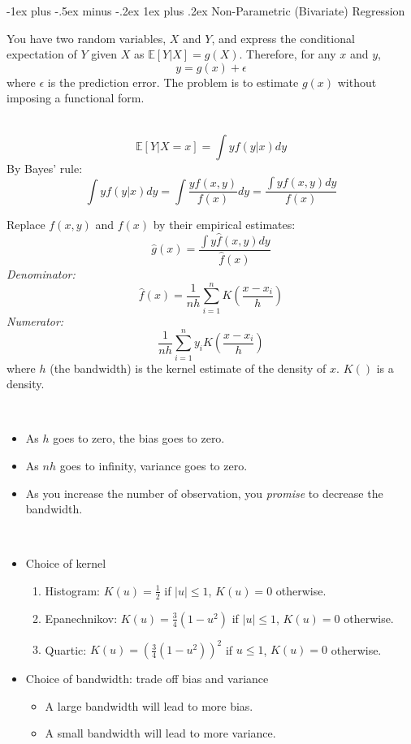 \documentclass[a4paper,10pt,landscape]{article}
\makeatletter
\renewcommand{\subsubsection}{\@startsection{subsubsection}{3}{0mm}%
                                {-1ex plus -.5ex minus -.2ex}%
                                {1ex plus .2ex}%
                                {\normalfont\small\bfseries}}
\makeatother
\begin{document}
\begin{multicols*}{3}
\subsubsection{Non-Parametric (Bivariate) Regression}
\begin{description}
	\item You have two random variables, $X$ and $Y$, and express the conditional expectation of $Y$ given $X$ as $\mathbb{E}[Y|X]=g(X)$. Therefore, for any $x$ and $y$, $$y=g(x)+\epsilon$$ where $\epsilon$ is the prediction error. The problem is to estimate $g(x)$ without imposing a functional form.
	\item[The Kernel Regression] ~
	$$\mathbb{E}\left[Y|X=x\right]=\int yf(y|x)dy$$
	By Bayes' rule:
	$$\int yf(y|x)dy=\int\dfrac{yf(x,y)}{f(x)}dy=\dfrac{\int yf(x,y)dy}{f(x)}$$
	\item[Kernel Estimator] Replace $f(x,y)$ and $f(x)$ by their empirical estimates:
	$$\hat{g}(x)=\dfrac{\int y\hat{f}(x,y)dy}{\hat{f}(x)}$$
	{\it Denominator:}
	$$\hat{f}(x)=\frac{1}{nh}\sum_{i=1}^{n}K\left(\frac{x-x_i}{h}\right)$$
	{\it Numerator:}
	$$\frac{1}{nh}\sum_{i=1}^{n}y_iK\left(\frac{x-x_i}{h}\right)$$
	where $h$ (the bandwidth) is the kernel estimate of the density of $x$. $K()$ is a density.
	\item[Large sample properties:] ~
	\begin{itemize}[noitemsep]
		\item As $h$ goes to zero, the bias goes to zero.
		\item As $nh$ goes to infinity, variance goes to zero.
		\item As you increase the number of observation, you {\it promise} to decrease the bandwidth.
	\end{itemize}
	\item[Choices to make:] ~
	\begin{itemize}[]
		\item Choice of kernel
		\begin{enumerate}
			\item Histogram: $K(u)=\frac{1}{2}$ if $|u|\leq1$, $K(u)=0$ otherwise.
			\item Epanechnikov: $K(u)=\frac{3}{4}(1-u^2)$ if $|u|\leq1$, $K(u)=0$ otherwise.
			\item Quartic: $K(u)=(\frac{3}{4}(1-u^2))^2$ if $u\leq1$, $K(u)=0$ otherwise.
		\end{enumerate}
		\item Choice of bandwidth: trade off bias and variance
		\begin{itemize}
			\item A large bandwidth will lead to more bias.
			\item A small bandwidth will lead to more variance.
		\end{itemize}
	\end{itemize}
\end{description}

\end{multicols*}
\end{document}
